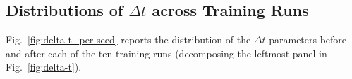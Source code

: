 \documentclass[10pt,letterpaper]{article}
\begin{document}
\subsection{Distributions of $\Delta t$ across Training Runs}
\label{sec:delta-t_acorss_runs}


Fig.~\ref{fig:delta-t_per-seed} reports the distribution of the $\Delta t$ parameters before and after each of the ten training runs (decomposing the leftmost panel in Fig.~\ref{fig:delta-t}).


\end{document}
